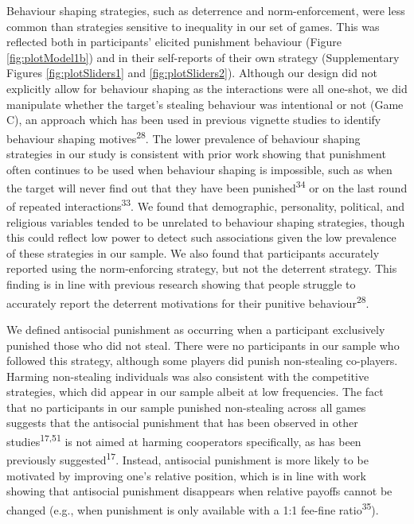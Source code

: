 \documentclass[
  man,floatsintext]{apa6}
\begin{document}
Behaviour shaping strategies, such as deterrence and norm-enforcement, were less
common than strategies sensitive to inequality in our set of games. This was
reflected both in participants' elicited punishment behaviour (Figure
\ref{fig:plotModel1b}) and in their self-reports of their own strategy
(Supplementary Figures \ref{fig:plotSliders1} and \ref{fig:plotSliders2}).
Although our design did not explicitly allow for behaviour shaping as the
interactions were all one-shot, we did manipulate whether the target's stealing
behaviour was intentional or not (Game C), an approach which has been used in
previous vignette studies to identify behaviour shaping motives\textsuperscript{28}.
The lower prevalence of behaviour shaping strategies in our study is consistent
with prior work showing that punishment often continues to be used when
behaviour shaping is impossible, such as when the target will never find out
that they have been punished\textsuperscript{34} or on the last round of repeated
interactions\textsuperscript{33}. We found that demographic, personality, political,
and religious variables tended to be unrelated to behaviour shaping strategies,
though this could reflect low power to detect such associations given the low
prevalence of these strategies in our sample. We also found that participants
accurately reported using the norm-enforcing strategy, but not the deterrent
strategy. This finding is in line with previous research showing that people
struggle to accurately report the deterrent motivations for their punitive
behaviour\textsuperscript{28}.

We defined antisocial punishment as occurring when a participant exclusively
punished those who did not steal. There were no participants in our sample who
followed this strategy, although some players did punish non-stealing
co-players. Harming non-stealing individuals was also consistent with the
competitive strategies, which did appear in our sample albeit at low frequencies.
The fact that no participants in our sample punished non-stealing across all
games suggests that the antisocial punishment that has been observed in other
studies\textsuperscript{17,51} is not aimed at harming cooperators
specifically, as has been previously suggested\textsuperscript{17}. Instead,
antisocial punishment is more likely to be motivated by improving one's
relative position, which is in line with work showing that antisocial punishment
disappears when relative payoffs cannot be changed (e.g., when punishment is
only available with a 1:1 fee-fine ratio\textsuperscript{35}).
\end{document}
